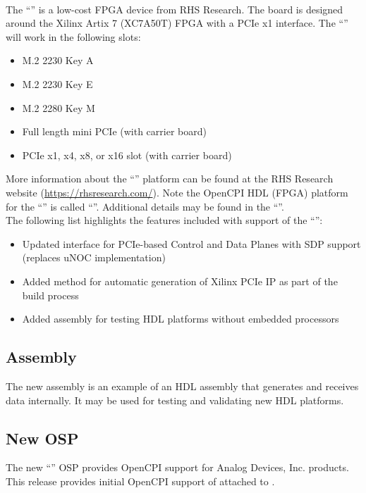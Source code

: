 The ``'' is a low-cost FPGA device from RHS Research\textsuperscript{\texttrademark}.  The board is designed around the Xilinx Artix 7 (XC7A50T) FPGA with a PCIe x1 interface.  The ``'' will work in the following slots:
\begin{itemize}
\setlength\itemsep{0em} %
\item M.2 2230 Key A
\item M.2 2230 Key E
\item M.2 2280 Key M
\item Full length mini PCIe (with carrier board)
\item PCIe x1, x4, x8, or x16 slot (with carrier board)
\end{itemize}
More information about the ``'' platform can be found at the RHS Research website (\url{https://rhsresearch.com/}).  Note the OpenCPI HDL (FPGA) platform for the ``'' is called ``''.  Additional details may be found in the ``''.\\

The following list highlights the features included with support of the ``'':
\begin{itemize}
\setlength\itemsep{0em} %
\item Updated interface for PCIe-based Control and Data Planes with SDP support (replaces uNOC implementation)
\item Added method for automatic generation of Xilinx PCIe IP as part of the build process
\item Added assembly for testing HDL platforms without embedded processors
\end{itemize}

\subsection{ Assembly}
\label{sec:23_tia_assy}
The new  assembly is an example of an HDL assembly that generates and receives data internally.  It may be used for testing and validating new HDL platforms.

\subsection{New  OSP}
\label{sec:23_analog}
The new ``'' OSP provides OpenCPI support for Analog Devices, Inc. products.  This release provides initial OpenCPI support of  attached to .  

